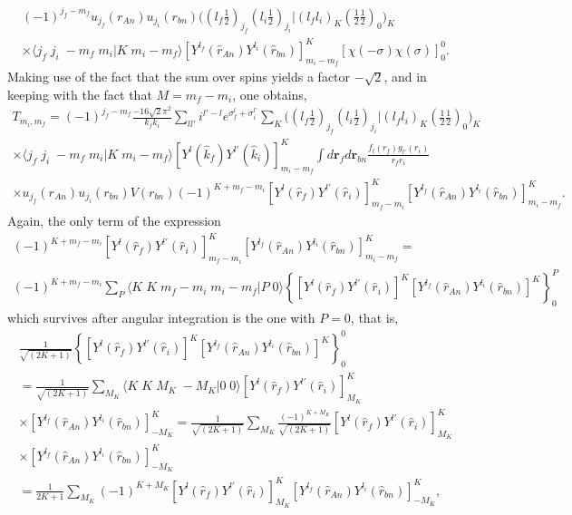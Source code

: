 \begin{multline}\label{eq_onept34}
(-1)^{j_f-m_f}u_{j_f}(r_{An})u_{j_i}(r_{bn})\bigl((l_f \tfrac{1}{2})_{j_f}(l_i \tfrac{1}{2})_{j_i}|(l_f l_i)_K(\tfrac{1}{2} \tfrac{1}{2})_0\bigr)_K\\
 \times\langle j_f\;j_i\;-m_f\;m_i|K\;m_i-m_f\rangle\left[Y^{l_f}(\hat r_{An})  Y^{l_i}(\hat r_{bn}) \right]^{K}_{m_i-m_f}\left[ \chi(-\sigma)\chi(\sigma)\right]^0_0.
\end{multline}
Making use of the fact that the sum over spins yields a factor $-\sqrt{2}$, and in keeping with the fact that $M=m_f-m_i$, one obtains,
\begin{multline}\label{eq_onept14}
T_{m_i,m_f}=(-1)^{j_f-m_f}\frac{-16\sqrt{2}\pi^2}{k_fk_i}\sum_{ll'}i^{l'-l}e^{\sigma_f^l+\sigma_i^{l'}}\sum_K\bigl((l_f \tfrac{1}{2})_{j_f}(l_i \tfrac{1}{2})_{j_i}|(l_f l_i)_K(\tfrac{1}{2} \tfrac{1}{2})_0\bigr)_K\\
\times\langle j_f\;j_i\;-m_f\;m_i|K\;m_i-m_f\rangle\left[ Y^{l} (\hat k_f) Y^{l'} (\hat k_i)\right]^K_{m_i-m_f}\int d\mathbf{r}_fd\mathbf{r}_{bn}\frac{f_l(r_f)g_{l'}(r_i)}{r_fr_i}\\
\times u_{j_f}(r_{An})u_{j_i}(r_{bn})V(r_{bn})
(-1)^{K+m_f-m_i}\left[ Y^{l} (\hat r_f) Y^{l'} (\hat r_i)\right]^K_{m_f-m_i}\left[ Y^{l_f}(\hat r_{An}) Y^{l_i}(\hat r_{bn})\right]^K_{m_i-m_f}.
\end{multline}
Again, the only term of the expression
\begin{multline*}
(-1)^{K+m_f-m_i}\left[ Y^{l} (\hat r_f) Y^{l'} (\hat r_i)\right]^K_{m_f-m_i}\left[ Y^{l_f}(\hat r_{An}) Y^{l_i}(\hat r_{bn})\right]^K_{m_i-m_f}=\\
(-1)^{K+m_f-m_i}\sum_P \langle K\;K\;m_f-m_i\;m_i-m_f|P\;0\rangle\left\{\left[ Y^{l} (\hat r_f) Y^{l'} (\hat r_i)\right]^K\left[ Y^{l_f}(\hat r_{An}) Y^{l_i}(\hat r_{bn})\right]^K\right\}^P_0
\end{multline*}
which survives after angular integration is the one with $P=0$, that is,
\begin{multline*}
\frac{1}{\sqrt{(2K+1)}}\left\{\left[ Y^{l} (\hat r_f) Y^{l'} (\hat r_i)\right]^K\left[ Y^{l_f}(\hat r_{An}) Y^{l_i}(\hat r_{bn})\right]^K\right\}^0_0\\
=\frac{1}{\sqrt{(2K+1)}}\sum_{M_K}\langle K\;K\;M_K\;-M_K|0\;0\rangle\left[ Y^{l} (\hat r_f) Y^{l'} (\hat r_i)\right]^K_{M_K}\\
\times\left[ Y^{l_f}(\hat r_{An}) Y^{l_i}(\hat r_{bn})\right]^K_{-M_K}=\frac{1}{\sqrt{(2K+1)}}\sum_{M_K}\frac{(-1)^{K+M_K}}{\sqrt{(2K+1)}}\left[ Y^{l} (\hat r_f) Y^{l'} (\hat r_i)\right]^K_{M_K}\\
\times\left[ Y^{l_f}(\hat r_{An}) Y^{l_i}(\hat r_{bn})\right]^K_{-M_K}\\
=\frac{1}{2K+1}\sum_{M_K}(-1)^{K+M_K}\left[ Y^{l} (\hat r_f) Y^{l'} (\hat r_i)\right]^K_{M_K}\left[ Y^{l_f}(\hat r_{An}) Y^{l_i}(\hat r_{bn})\right]^K_{-M_K},
\end{multline*}
